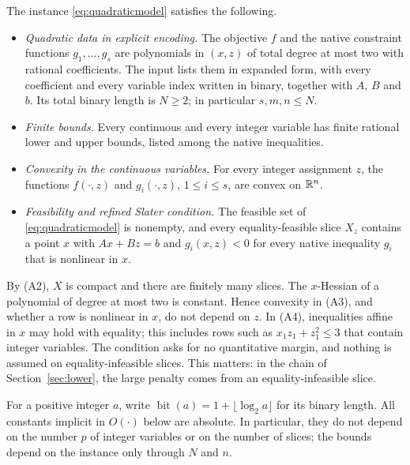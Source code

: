 \begin{assumption}\label{ass:model}
The instance \eqref{eq:quadraticmodel} satisfies the following.
\begin{itemize}
\item[(A1)] \emph{Quadratic data in explicit encoding.} The objective
 $f$ and the native constraint functions $g_1,\ldots,g_s$ are
 polynomials in $(x,z)$ of total degree at most two with rational
 coefficients. The input lists them in expanded form, with every
 coefficient and every variable index written in binary, together with
 $A$, $B$ and $b$. Its total binary length is $N\ge2$; in particular
 $s,m,n\le N$.
\item[(A2)] \emph{Finite bounds.} Every continuous and every integer
 variable has finite rational lower and upper bounds, listed among the
 native inequalities.
\item[(A3)] \emph{Convexity in the continuous variables.} For every
 integer assignment $z$, the functions $f(\cdot,z)$ and
 $g_i(\cdot,z)$, $1\le i\le s$, are convex on $\mathbb R^n$.
\item[(A4)] \emph{Feasibility and refined Slater condition.} The
 feasible set of \eqref{eq:quadraticmodel} is nonempty, and every
 equality-feasible slice $X_z$ contains a point $x$ with $Ax+Bz=b$ and
 $g_i(x,z)<0$ for every native inequality $g_i$ that is nonlinear in
 $x$.
\end{itemize}
\end{assumption}
By (A2), $X$ is compact and there are finitely many slices. The
$x$-Hessian of a polynomial of degree at most two is constant. Hence
convexity in (A3), and whether a row is nonlinear in $x$, do not depend
on $z$. In (A4), inequalities affine in $x$ may hold with equality; this
includes rows such as $x_1z_1+z_1^2\le3$ that contain integer variables.
The condition asks for no quantitative margin, and nothing is assumed on
equality-infeasible slices. This matters: in the chain of
Section~\ref{sec:lower}, the large penalty comes from an
equality-infeasible slice.

For a positive integer $a$, write
$\operatorname{bit}(a)=1+\lfloor\log_2 a\rfloor$ for its binary length.
All constants implicit in $O(\cdot)$ below are absolute. In particular,
they do not depend on the number $p$ of integer variables or on the
number of slices; the bounds depend on the instance only through $N$ and
$n$.

